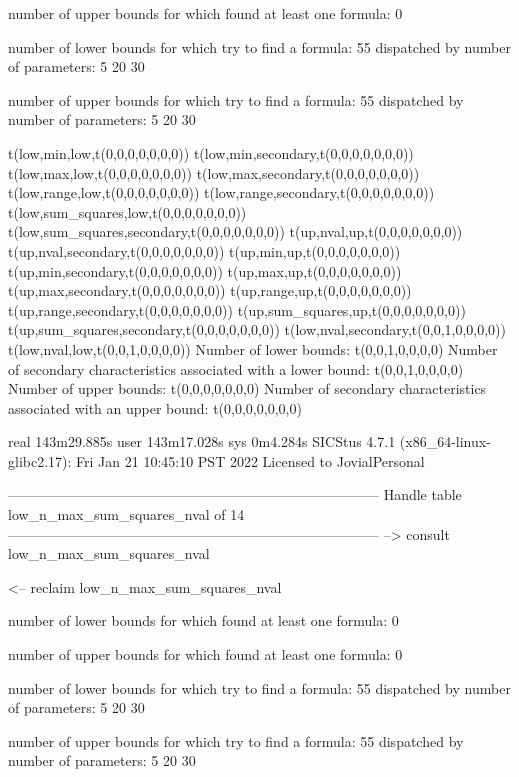 number of upper bounds for which found at least one formula: 0

number of lower bounds for which try to find a formula: 55
dispatched by number of parameters: 5  20  30

number of upper bounds for which try to find a formula: 55
dispatched by number of parameters: 5  20  30

t(low,min,low,t(0,0,0,0,0,0,0))
t(low,min,secondary,t(0,0,0,0,0,0,0))
t(low,max,low,t(0,0,0,0,0,0,0))
t(low,max,secondary,t(0,0,0,0,0,0,0))
t(low,range,low,t(0,0,0,0,0,0,0))
t(low,range,secondary,t(0,0,0,0,0,0,0))
t(low,sum_squares,low,t(0,0,0,0,0,0,0))
t(low,sum_squares,secondary,t(0,0,0,0,0,0,0))
t(up,nval,up,t(0,0,0,0,0,0,0))
t(up,nval,secondary,t(0,0,0,0,0,0,0))
t(up,min,up,t(0,0,0,0,0,0,0))
t(up,min,secondary,t(0,0,0,0,0,0,0))
t(up,max,up,t(0,0,0,0,0,0,0))
t(up,max,secondary,t(0,0,0,0,0,0,0))
t(up,range,up,t(0,0,0,0,0,0,0))
t(up,range,secondary,t(0,0,0,0,0,0,0))
t(up,sum_squares,up,t(0,0,0,0,0,0,0))
t(up,sum_squares,secondary,t(0,0,0,0,0,0,0))
t(low,nval,secondary,t(0,0,1,0,0,0,0))
t(low,nval,low,t(0,0,1,0,0,0,0))
Number of lower bounds:                                             t(0,0,1,0,0,0,0)
Number of secondary characteristics associated with a lower bound:  t(0,0,1,0,0,0,0)
Number of upper bounds:                                             t(0,0,0,0,0,0,0)
Number of secondary characteristics associated with an upper bound: t(0,0,0,0,0,0,0)

real	143m29.885s
user	143m17.028s
sys	0m4.284s
SICStus 4.7.1 (x86_64-linux-glibc2.17): Fri Jan 21 10:45:10 PST 2022
Licensed to JovialPersonal


--------------------------------------------------------------------------------
Handle table low_n_max_sum_squares_nval of 14
--------------------------------------------------------------------------------
--> consult low_n_max_sum_squares_nval

<-- reclaim low_n_max_sum_squares_nval

number of lower bounds for which found at least one formula: 0

number of upper bounds for which found at least one formula: 0

number of lower bounds for which try to find a formula: 55
dispatched by number of parameters: 5  20  30

number of upper bounds for which try to find a formula: 55
dispatched by number of parameters: 5  20  30

